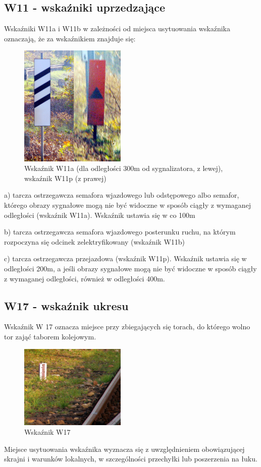 \subsection{W11 - wskaźniki uprzedzające}
Wskaźniki W11a i W11b w zależności od miejsca usytuowania wskaźnika oznaczają, że za wskaźnikiem znajduje się:
\begin{figure}
	\includegraphics[width=0.45\textwidth]{skryptkierownik-img/wskazniki-w11.jpg}
	\caption{Wskaźnik W11a (dla odległości 300m od sygnalizatora, z lewej), wskaźnik W11p (z prawej)} 
\end{figure}
a) tarcza ostrzegawcza semafora wjazdowego lub odstępowego albo semafor, którego obrazy sygnałowe mogą nie być widoczne w sposób ciągły z wymaganej odległości (wskaźnik W11a). Wskaźnik ustawia się w co 100m

b) tarcza ostrzegawcza semafora wjazdowego posterunku ruchu, na którym rozpoczyna się odcinek zelektryfikowany (wskaźnik W11b)

c) tarcza ostrzegawcza przejazdowa (wskaźnik W11p). Wskaźnik ustawia się w odległości 200m, a jeśli obrazy sygnałowe mogą nie być widoczne w sposób ciągły z wymaganej odległości, również w odległości 400m.


\subsection{W17 - wskaźnik ukresu}

\begin{tcolorbox}[colback=black!5!white,colframe=white!55!black,title=Wskaźnik W17]
Wskaźnik W 17 oznacza miejsce przy zbiegających się torach, do którego wolno tor zająć taborem kolejowym. 
\end{tcolorbox}
\begin{figure}
	\includegraphics[width=0.45\textwidth]{skryptkierownik-img/skryptkierownik-img016.jpg}
	\caption{Wskaźnik W17}
\end{figure}
Miejsce usytuowania wskaźnika wyznacza się z uwzględnieniem obowiązującej skrajni i warunków lokalnych, w szczególności przechyłki lub poszerzenia na łuku.




